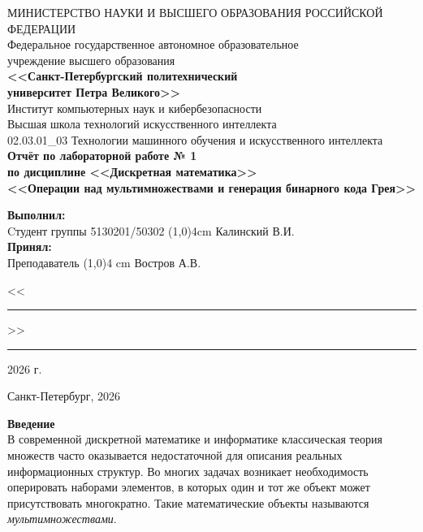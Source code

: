 \documentclass[14pt, a4paper]{extarticle}
\begin{document}
	\thispagestyle{empty}
	\begin{center}
		\hspace{0.2cm}МИНИСТЕРСТВО НАУКИ И ВЫСШЕГО ОБРАЗОВАНИЯ РОССИЙСКОЙ ФЕДЕРАЦИИ\\
		Федеральное государственное автономное образовательное\\
		учреждение высшего образования\\
		{\bf <<Санкт-Петербургский политехнический\\
			университет Петра Великого>>}\\
		Институт компьютерных наук и кибербезопасности\\
		Высшая школа технологий искусственного интеллекта\\
		02.03.01\_03 Технологии машинного обучения и искусственного интеллекта\\
		\vspace{2.5cm}
		\Large\bf{
			Отчёт по лабораторной работе № 1 \\
			по дисциплине <<Дискретная математика>>\\[0.8cm]
			<<Операции над мультимножествами и генерация бинарного кода Грея>>\\[1cm]
		}
	\end{center}
	\vspace{1.5cm}
	\begin{flushleft}
		{\bf Выполнил:}\\
		Cтудент группы 5130201/50302 \hfill
		\line(1,0){4cm} \quad Калинский В.И.\\
		{\bf Принял:}\\
		Преподаватель \hfill
		\line(1,0){4 cm} \quad Востров А.В.\\[0.5cm]
		{ \hfill<<\rule{1cm}{0.5pt}>>\rule{2cm}{0.5pt}\hspace{3pt}2026 г.}
	\end{flushleft}
	\vspace{1cm}
	\begin{center}
		Санкт-Петербург, 2026
	\end{center}
	\newpage
	
	\tableofcontents
	
	\newpage
	\thispagestyle{empty}
	{\LARGE\bf Введение}\\
	
	В современной дискретной математике и информатике классическая теория множеств часто оказывается недостаточной для описания реальных информационных структур. Во многих задачах возникает необходимость оперировать наборами элементов, в которых один и тот же объект может присутствовать многократно. Такие математические объекты называются \textit{мультимножествами}.
	
\end{document}
